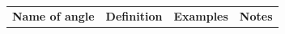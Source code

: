 \begin{table}[H]
    
            
    
        \begin{center}
      
      \label{m38380*uid30}
      
    \noindent
      \tablelasttail{}
      \begin{xtabular*}{\mytablewidth}[t]{|p{3cm}|p{3cm}|p{3cm}|p{20\mystarwidth}|}\hline
    
    
        
                  \textbf{Name of angle}
                 &
    
    
        
                  \textbf{Definition}
                 &
    
    
        
                  \textbf{Examples}
                 &
    
    
        
                  \textbf{Notes}
     \tabularnewline{}
    
    

\end{xtabular*}
\end{center}
\end{table}
